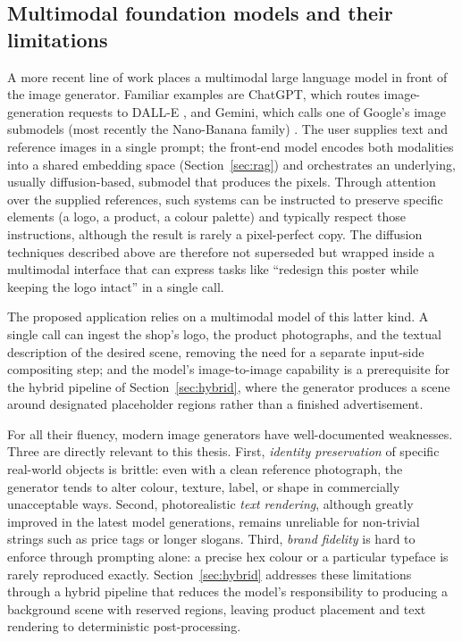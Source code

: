 \subsection{Multimodal foundation models and their limitations}

A more recent line of work places a multimodal large language model in front of the image generator. Familiar examples are ChatGPT, which routes image-generation requests to DALL-E \cite{openai_dalle3}, and Gemini, which calls one of Google's image submodels (most recently the Nano-Banana family) \cite{google_nanobanana}. The user supplies text and reference images in a single prompt; the front-end model encodes both modalities into a shared embedding space (Section~\ref{sec:rag}) and orchestrates an underlying, usually diffusion-based, submodel that produces the pixels. Through attention over the supplied references, such systems can be instructed to preserve specific elements (a logo, a product, a colour palette) and typically respect those instructions, although the result is rarely a pixel-perfect copy. The diffusion techniques described above are therefore not superseded but wrapped inside a multimodal interface that can express tasks like ``redesign this poster while keeping the logo intact'' in a single call.

The proposed application relies on a multimodal model of this latter kind. A single call can ingest the shop's logo, the product photographs, and the textual description of the desired scene, removing the need for a separate input-side compositing step; and the model's image-to-image capability is a prerequisite for the hybrid pipeline of Section~\ref{sec:hybrid}, where the generator produces a scene around designated placeholder regions rather than a finished advertisement.

For all their fluency, modern image generators have well-documented weaknesses. Three are directly relevant to this thesis. First, \emph{identity preservation} of specific real-world objects is brittle: even with a clean reference photograph, the generator tends to alter colour, texture, label, or shape in commercially unacceptable ways. Second, photorealistic \emph{text rendering}, although greatly improved in the latest model generations, remains unreliable for non-trivial strings such as price tags or longer slogans. Third, \emph{brand fidelity} is hard to enforce through prompting alone: a precise hex colour or a particular typeface is rarely reproduced exactly. Section~\ref{sec:hybrid} addresses these limitations through a hybrid pipeline that reduces the model's responsibility to producing a background scene with reserved regions, leaving product placement and text rendering to deterministic post-processing.

